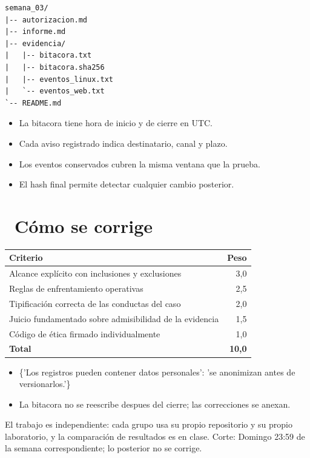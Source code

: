 \documentclass[11pt,a4paper]{article}
\newcommand{\iconotexto}[2]{\textcolor{cyanNeon}{\faIcon{#1}}~#2}
\begin{document}
\begin{lstlisting}[style=estiloCodigo]
semana_03/
|-- autorizacion.md
|-- informe.md
|-- evidencia/
|   |-- bitacora.txt
|   |-- bitacora.sha256
|   |-- eventos_linux.txt
|   `-- eventos_web.txt
`-- README.md
\end{lstlisting}

\begin{itemize}[leftmargin=1.4em,itemsep=2pt,topsep=3pt]
  \item La bitacora tiene hora de inicio y de cierre en UTC.
  \item Cada aviso registrado indica destinatario, canal y plazo.
  \item Los eventos conservados cubren la misma ventana que la prueba.
  \item El hash final permite detectar cualquier cambio posterior.
\end{itemize}

\section{\iconotexto{ruler-combined}{Cómo se corrige}}

\begin{tabularx}{\linewidth}{@{}X r@{}}
\toprule
Criterio & Peso\\
\midrule
Alcance explícito con inclusiones y exclusiones & 3,0 \\
Reglas de enfrentamiento operativas & 2,5 \\
Tipificación correcta de las conductas del caso & 2,0 \\
Juicio fundamentado sobre admisibilidad de la evidencia & 1,5 \\
Código de ética firmado individualmente & 1,0 \\
\midrule
\textbf{Total} & \textbf{10,0}\\
\bottomrule
\end{tabularx}

\begin{itemize}[leftmargin=1.4em,itemsep=2pt,topsep=3pt]
  \item \{'Los registros pueden contener datos personales': 'se anonimizan antes de versionarlos.'\}
  \item La bitacora no se reescribe despues del cierre; las correcciones se anexan.
\end{itemize}

\begin{cajaRecuerda}El trabajo es independiente: cada grupo usa su propio repositorio y su propio laboratorio, y la comparación de resultados es en clase. Corte: Domingo 23:59 de la semana correspondiente; lo posterior no se corrige.
\end{cajaRecuerda}
\end{document}
